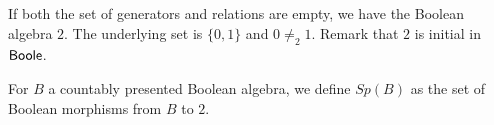 \begin{example}
  If both the set of generators and relations are empty, we have the Boolean algebra $2$.
  The underlying set is $\{0,1\}$ and $0\neq_2 1$.
  Remark that $2$ is initial in $\mathsf{Boole}$. 
\end{example}
%
\begin{definition}
  For $B$ a countably presented Boolean algebra, 
  we define $Sp(B)$ as the set of Boolean morphisms from $B$ to $2$. 
\end{definition}

